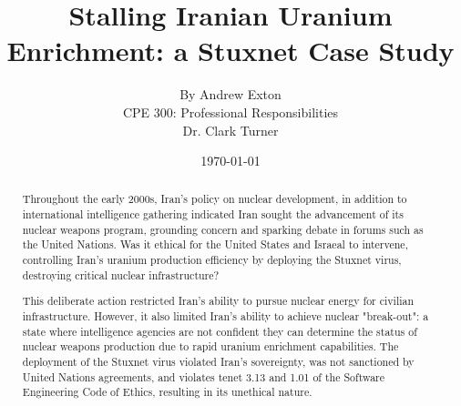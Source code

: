\documentclass[12pt]{article}
\begin{document}
\title{\vfill Stalling Iranian Uranium Enrichment: a Stuxnet Case Study } %
\author{
By Andrew Exton \vspace{10pt} \\
CPE 300: Professional Responsibilities  \vspace{10pt} \\
Dr. Clark Turner \vspace{10pt} \\
}
\date{\today} %

\maketitle

\vfill  %
\begin{abstract}
Throughout the early 2000s, Iran's policy on nuclear development, in addition to international intelligence gathering indicated Iran sought the advancement of its nuclear weapons program, grounding concern and sparking debate in forums such as the United Nations.\cite{unitedNationsResolutions}
Was it ethical for the United States and Israeal to intervene, controlling Iran's uranium production efficiency by deploying the Stuxnet virus, destroying critical nuclear infrastructure?

This deliberate action restricted Iran's ability to pursue nuclear energy for civilian infrastructure. However, it also limited Iran's ability to achieve nuclear "break-out": a state where  intelligence agencies are not confident they can determine the status of nuclear weapons production due to rapid uranium enrichment capabilities. The deployment of the Stuxnet virus violated Iran's sovereignty, was not sanctioned by United Nations agreements, and violates tenet 3.13 and 1.01 of the Software Engineering Code of Ethics, resulting in its unethical nature.


\end{abstract}

\thispagestyle{empty} %
\newpage

\tableofcontents
\newpage
\end{document}
